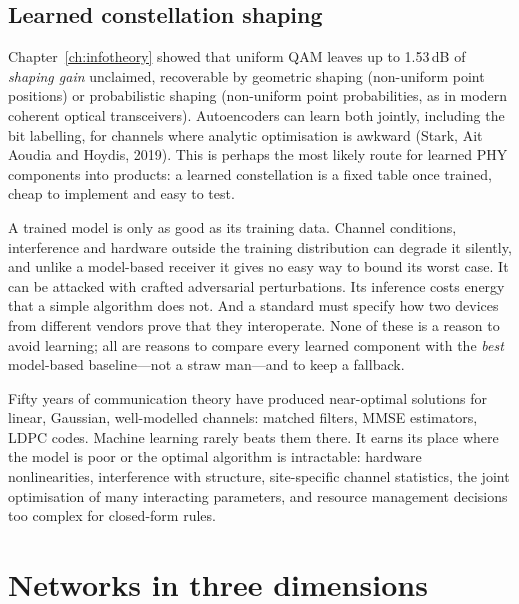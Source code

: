 \subsection{Learned constellation shaping}

Chapter~\ref{ch:infotheory} showed that uniform QAM leaves up to 1.53\,dB of \emph{shaping gain}
unclaimed, recoverable by geometric shaping (non-uniform point positions) or probabilistic shaping
(non-uniform point probabilities, as in modern coherent optical transceivers). Autoencoders can learn
both jointly, including the bit labelling, for channels where analytic optimisation is awkward
(Stark, Ait Aoudia and Hoydis, 2019). This is perhaps the most likely route for learned PHY components
into products: a learned constellation is a fixed table once trained, cheap to implement and easy to
test.

\begin{pitfall}
A trained model is only as good as its training data. Channel conditions, interference and hardware
outside the training distribution can degrade it silently, and unlike a model-based receiver it gives
no easy way to bound its worst case. It can be attacked with crafted adversarial perturbations. Its
inference costs energy that a simple algorithm does not. And a standard must specify how two devices
from different vendors prove that they interoperate. None of these is a reason to avoid learning; all
are reasons to compare every learned component with the \emph{best} model-based baseline---not a
straw man---and to keep a fallback.
\end{pitfall}

\begin{keyidea}
Fifty years of communication theory have produced near-optimal solutions for linear, Gaussian,
well-modelled channels: matched filters, MMSE estimators, LDPC codes. Machine learning rarely beats
them there. It earns its place where the model is poor or the optimal algorithm is intractable:
hardware nonlinearities, interference with structure, site-specific channel statistics, the joint
optimisation of many interacting parameters, and resource management decisions too complex for
closed-form rules.
\end{keyidea}

\section{Networks in three dimensions}
\label{sec:ch25:ntn}

